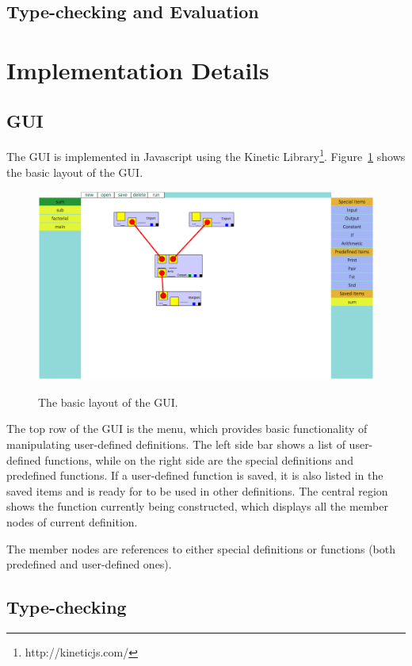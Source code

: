 \documentclass[12pt,UTF8,a4]{article}
\begin{document}
\subsection{Type-checking and Evaluation}



\section{Implementation Details}
\subsection{GUI}
The GUI is implemented in Javascript using the Kinetic Library\footnote{http://kineticjs.com/}. Figure~\ref{fig:gui} shows the basic layout of the GUI.
\begin{figure}[h]
\center
\includegraphics[width=.95\textwidth]{./images/gui.png} \\
\caption{The basic layout of the GUI.}\label{fig:gui}
\end{figure}
The top row of the GUI is the menu, which provides basic functionality of manipulating user-defined definitions. The left side bar shows a list of user-defined functions, while on the right side are the special definitions and predefined functions. If a user-defined function is saved, it is also listed in the saved items and is ready for to be used in other definitions. The central region shows the function currently being constructed, which displays all the member nodes of current definition.

The member nodes are references to either special definitions or functions (both predefined and user-defined ones).

\subsection{Type-checking}
\end{document}
